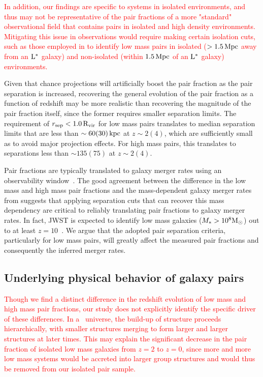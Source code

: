 \documentclass[twocolumn]{aastex631}
\newcommand{\add}[1]{\textcolor{red}{#1}}
\newcommand{\Rvir}{\ensuremath{\rm R_{vir}}}
\begin{document}
    \add{In addition, our findings are specific to systems in isolated environments, and thus may not be representative of the pair fractions of a more "standard" observational field that contains pairs in isolated and high density environments.}
    \add{Mitigating this issue in observations would require making certain isolation cuts, such as those employed in \citet{Geha2013} to identify low mass pairs in isolated ($>1.5\,\mathrm{Mpc}$ away from an $\rm L^{*}$ galaxy) and non-isolated (within $1.5\,\mathrm{Mpc}$ of an $\rm L^{*}$ galaxy) environments.}

    Given that chance projections will artificially boost the pair fraction as the pair separation is increased, recovering the general evolution of the pair fraction as a function of redshift may be more realistic than recovering the magnitude of the pair fraction itself, since the former requires smaller separation limits. 
    The requirement of $r_{\mathrm{sep}} < 1.0\,\Rvir$ for low mass pairs translates to median separation limits that are less than $\sim 60(30)\mathrm{\,kpc}$ at $z \sim2(4)$, which are sufficiently small as to avoid major projection effects. 
    For high mass pairs, this translates to separations less than $\sim135(75)$ at $z\sim2(4)$.

    Pair fractions are typically translated to galaxy merger rates using an observability window~\citep{Lotz2011}.
    The good agreement between the difference in the low mass and high mass pair fractions and the mass-dependent galaxy merger rates from \cite{RG2015} suggests that applying separation cuts that can recover this mass dependency are critical to reliably translating pair fractions to galaxy merger rates. 
    In fact, JWST is expected to identify low mass galaxies ($M_* > 10^8\mathrm{M}_\odot$) out to at least $z=10$~\citep{Cowley2018,Williams2018,Behroozi2020}. 
    We argue that the adopted pair separation criteria, particularly for low mass pairs, will greatly affect the measured pair fractions and consequently the inferred merger rates. 
    
\subsection{Underlying physical behavior of galaxy pairs}\label{sec:disc-diff}
    \add{Though we find a distinct difference in the redshift evolution of low mass and high mass pair fractions, our study does not explicitly identify the specific driver of these differences.}
    \add{In a \lcdm\ universe, the build-up of structure proceeds hierarchically, with smaller structures merging to form larger and larger structures at later times.}
    \add{This may explain the significant decrease in the pair fraction of isolated low mass galaxies from $z=2$ to $z=0$, since more and more low mass systems would be accreted into larger group structures and would thus be removed from our isolated pair sample.}
    
\end{document}
